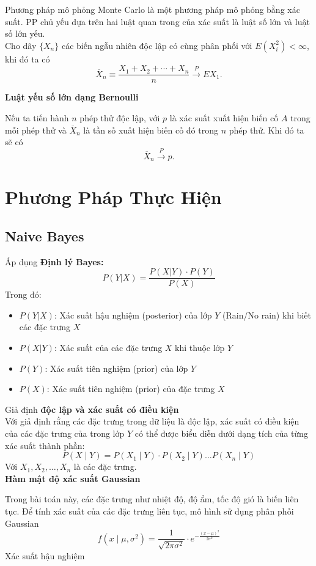 \documentclass[conference]{IEEEtran}
\begin{document}
\indent Phương pháp mô phỏng Monte Carlo là một phương pháp mô phỏng bằng xác suất. PP chủ yếu dựa trên hai luật quan trong của xác suất là luật số lớn và luật số lớn yếu.
\\
\indent Cho dãy \(\{X_n\}\) các biến ngẫu nhiên độc lập có cùng phân phối với \(E(X_i^2) < \infty\), khi đó ta có
\[
\overline{X}_n \equiv \frac{X_1 + X_2 + \cdots + X_n}{n} \xrightarrow{P} EX_1.
\]

\noindent \textbf{Luật yếu số lớn dạng Bernoulli}

Nếu ta tiến hành \(n\) phép thử độc lập, với \(p\) là xác suất xuất hiện biến cố \(A\) trong mỗi phép thử và \(\overline{X}_n\) là tần số xuất hiện biến cố đó trong \(n\) phép thử. Khi đó ta sẽ có
\[  
\overline{X}_n \xrightarrow{P} p.
\]
\section{Phương Pháp Thực Hiện}
\subsection{Naive Bayes}
\noindent Áp dụng \textbf{Định lý Bayes:}
\[
P(Y|X) = \frac{P(X|Y) \cdot P(Y)}{P(X)}
\]
\noindent Trong đó: 
\begin{itemize}
    \item \( P(Y|X) \): Xác suất hậu nghiệm (posterior) của lớp \( Y \) (Rain/No rain) khi biết các đặc trưng \( X \)
    \item \( P(X|Y) \): Xác suất của các đặc trưng \( X \) khi thuộc lớp \( Y \)
    \item \( P(Y) \): Xác suất tiên nghiệm (prior) của lớp \( Y \)
    \item \( P(X) \): Xác suất tiên nghiệm (prior) của đặc trưng \( X \)
\end{itemize}
Giả định \textbf{độc lập và xác suất có điều kiện}\\
\indent Với giả định rằng các đặc trưng trong dữ liệu là độc lập, xác suất có điều kiện của các đặc trưng của trong lớp \( Y \) có thể được biểu diễn dưới dạng tích của từng xác suất thành phần:
\[
P(X \mid Y) = P(X_1 \mid Y) \cdot P(X_2 \mid Y) \dots P(X_n \mid Y)
\]
Với \( X_1, X_2, \dots, X_n \) là các đặc trưng.\\
\textbf{Hàm mật độ xác suất Gaussian}

Trong bài toán này, các đặc trưng như nhiệt độ, độ ẩm, tốc độ gió là biến liên tục. Để tính xác suất của các đặc trưng liên tục, mô hình sử dụng phân phối Gaussian
\[
f(x \mid \mu, \sigma^2) = \frac{1}{\sqrt{2 \pi \sigma^2}} \cdot e^{-\frac{(x - \mu)^2}{2 \sigma^2}}
\]
\textbf{}{Xác suất hậu nghiệm}
\end{document}
